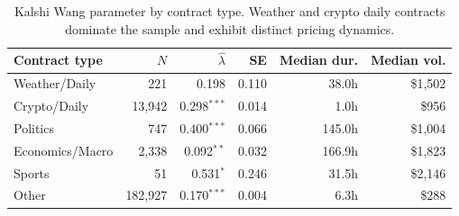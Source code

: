 \begin{table}[H]
\centering
\small
\caption{Kalshi Wang parameter by contract type. Weather and crypto daily contracts dominate the sample and exhibit distinct pricing dynamics.}
\label{tab:kalshi_contract_types}
\begin{tabular}{lrrrrr}
\toprule
Contract type & $N$ & $\hat{\lambda}$ & SE & Median dur. & Median vol. \\
\midrule
Weather/Daily & 221 & 0.198 & 0.110 & 38.0h & \$1,502 \\
Crypto/Daily & 13,942 & 0.298$^{***}$ & 0.014 & 1.0h & \$956 \\
Politics & 747 & 0.400$^{***}$ & 0.066 & 145.0h & \$1,004 \\
Economics/Macro & 2,338 & 0.092$^{**}$ & 0.032 & 166.9h & \$1,823 \\
Sports & 51 & 0.531$^{*}$ & 0.246 & 31.5h & \$2,146 \\
Other & 182,927 & 0.170$^{***}$ & 0.004 & 6.3h & \$288 \\
\bottomrule
\end{tabular}
\end{table}